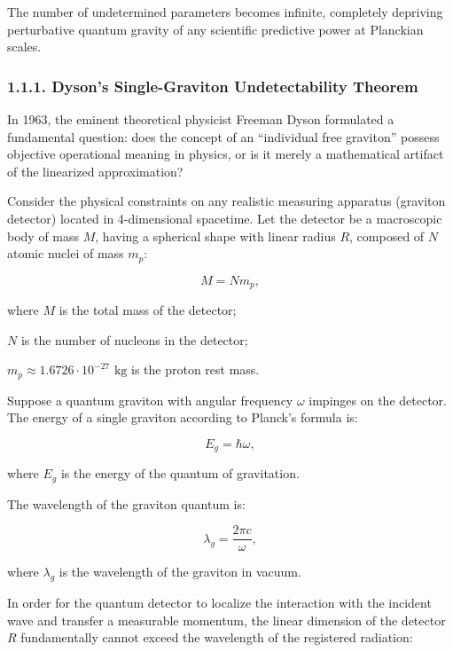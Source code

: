 The number of undetermined parameters becomes infinite, completely depriving perturbative quantum gravity of any scientific predictive power at Planckian scales.


\subsubsection{1.1.1. Dyson's Single-Graviton Undetectability Theorem \cite{ref4}}\label{sec:1.1.1}

In 1963, the eminent theoretical physicist Freeman Dyson formulated a fundamental question: does the concept of an ``individual free graviton'' possess objective operational meaning in physics, or is it merely a mathematical artifact of the linearized approximation?

Consider the physical constraints on any realistic measuring apparatus (graviton detector) located in 4-dimensional spacetime. Let the detector be a macroscopic body of mass $M$, having a spherical shape with linear radius $R$, composed of $N$ atomic nuclei of mass $m_p$:

\begin{equation}\label{eq:1.16}\tag{1.16}
M = N m_p,
\end{equation}

where $M$ is the total mass of the detector;  

$N$ is the number of nucleons in the detector;  

$m_p \approx 1.6726 \cdot 10^{-27}\text{ kg}$ is the proton rest mass.

Suppose a quantum graviton with angular frequency $\omega$ impinges on the detector. The energy of a single graviton according to Planck's formula is:

\begin{equation}\label{eq:1.17}\tag{1.17}
E_g = \hbar \omega,
\end{equation}

where $E_g$ is the energy of the quantum of gravitation.

The wavelength of the graviton quantum is:

\begin{equation}\label{eq:1.18}\tag{1.18}
\lambda_g = \frac{2\pi c}{\omega},
\end{equation}

where $\lambda_g$ is the wavelength of the graviton in vacuum.

In order for the quantum detector to localize the interaction with the incident wave and transfer a measurable momentum, the linear dimension of the detector $R$ fundamentally cannot exceed the wavelength of the registered radiation:

